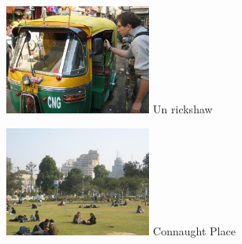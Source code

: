 \begin{multicols}{2}
\hspace*{-0.65cm}
\includegraphics[width=4.8cm]{articles/Des-indiens-dans-la-ville/ricksaw.jpg}
Un rickshaw

\hspace*{-0.65cm}
\includegraphics[width=4.8cm]{articles/Des-indiens-dans-la-ville/connaughtplace.jpg}
Connaught Place

\end{multicols}


